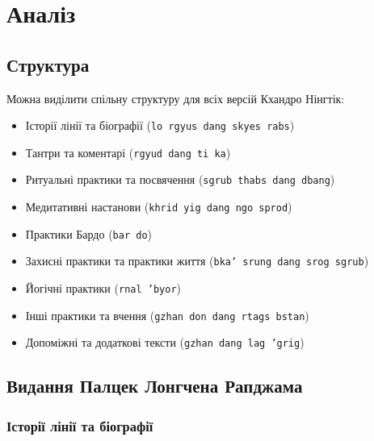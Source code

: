 \documentclass{article}
\begin{document}
\section{Аналіз}

\subsection{Структура}

Можна виділити спільну структуру для всіх версій Кхандро Нінгтік:

\begin{itemize}
\item Історії лінії та біографії (\texttt{lo rgyus dang skyes rabs})
\item Тантри та коментарі (\texttt{rgyud dang ti ka})
\item Ритуальні практики та посвячення (\texttt{sgrub thabs dang dbang})
\item Медитативні настанови (\texttt{khrid yig dang ngo sprod})
\item Практики Бардо (\texttt{bar do})
\item Захисні практики та практики життя (\texttt{bka' srung dang srog sgrub})
\item Йогічні практики (\texttt{rnal 'byor})
\item Інші практики та вчення (\texttt{gzhan don dang rtags bstan})
\item Допоміжні та додаткові тексти (\texttt{gzhan dang lag 'grig})
\end{itemize}

\newpage
\subsection{Видання Палцек Лонгчена Рапджама}

\subsubsection{Історії лінії та біографії}
\end{document}
